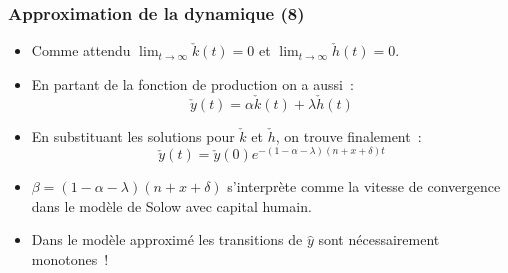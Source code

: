 \documentclass[10pt,notheorems]{beamer}
\theoremstyle{plain}
\theoremstyle{definition} %
\begin{document}
\begin{frame}
  \frametitle{Approximation de la dynamique (8)}

  \begin{itemize}

  \item Comme attendu $\lim_{t\rightarrow\infty}\check{k}(t)=0$ et $\lim_{t\rightarrow\infty}\check{h}(t)=0$.\newline

  \item En partant de la fonction de production on a aussi~:
    \[
      \check{y}(t) = \alpha\check{k}(t) + \lambda\check{h}(t)
    \]

  \item En substituant les solutions pour $\check{k}$ et $\check{h}$, on trouve finalement~:
    \medskip
    \[
      \check{y}(t) = \check{y}(0)e^{-(1-\alpha-\lambda)(n+x+\delta)t}
    \]
    \medskip

  \item $\beta = (1-\alpha-\lambda)(n+x+\delta)$ s'interprète comme la vitesse de convergence dans le modèle de Solow avec capital humain.\newline

  \item Dans le modèle approximé les transitions de $\hat y$ sont nécessairement monotones~!

  \end{itemize}
\end{frame}
\end{document}
